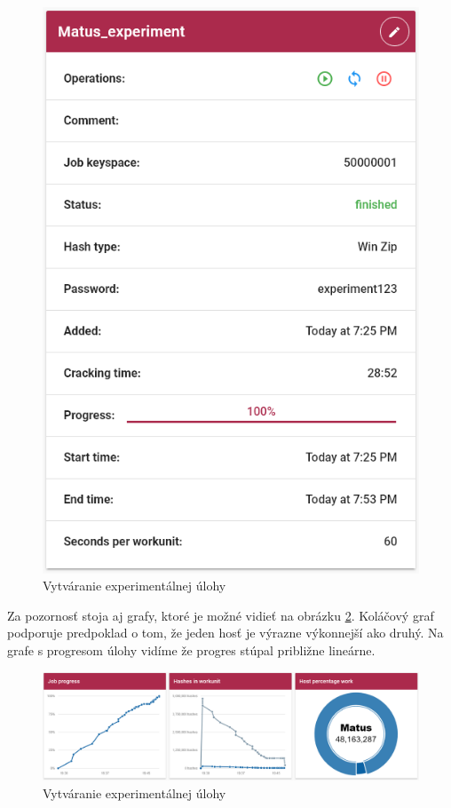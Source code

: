 \documentclass[slovak]{fitthesis}
\begin{document}
\begin{figure}[H]
    \centering
    \includegraphics[scale=0.6]{obrazky/exp2.PNG}
    \caption{Vytváranie experimentálnej úlohy}
    \label{fig:exp2}
\end{figure}
Za pozornosť stoja aj grafy, ktoré je možné vidieť na obrázku \ref{fig:exp3}. Koláčový graf podporuje predpoklad o tom, že jeden hosť je výrazne výkonnejší ako druhý. Na grafe s progresom úlohy vidíme že progres stúpal približne lineárne. 
\begin{figure}[H]
    \centering
    \includegraphics[scale=0.4]{obrazky/exp3.PNG}
    \caption{Vytváranie experimentálnej úlohy}
    \label{fig:exp3}
\end{figure}
\end{document}
